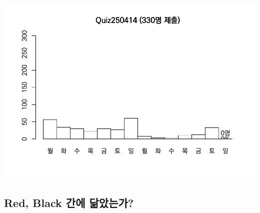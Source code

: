 \documentclass[
]{book}
\begin{document}
\includegraphics{Quiz_report_2025_files/figure-latex/unnamed-chunk-210-1.pdf}

\subsection{Red, Black 간에 닮았는가?}\label{red-black-uxac04uxc5d0-uxb2eeuxc558uxb294uxac00-6}
\end{document}
